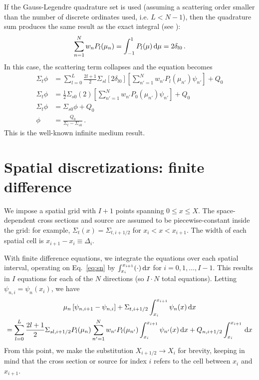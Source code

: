 \documentclass[]{SRJcommon}
\begin{document}
If the Gauss-Legendre quadrature set is used (assuming a scattering order
smaller than the number of discrete ordinates used, i.e. $L < N-1$),
then the quadrature sum
produces the same result as the exact integral (see \cite[p.121]{Lew1984}):
$$ \sum_{n=1}^{N} w_{n} P_{l}(\mu_n) 
= \int_{-1}^{1} P_l(\mu) \, \mathrm{d} \mu
= 2 \delta_{l0} \,.$$
In this case, the scattering term collapses and the equation becomes
\begin{align*}
  \Sigma_t \phi 
  &= \sum_{l=0}^{L}  \frac{2l+1}{2} \Sigma_{sl} \left[ 2 \delta_{l0} \right] \left[ \sum_{n'=1}^{N} w_{n'} P_{l} (\mu_{n'}) \psi_{n'}
\right] + Q_0
\\
  \Sigma_t \phi 
  &=  \frac{1}{2} \Sigma_{s0} (2) \left[ \sum_{n'=1}^{N} w_{n'} P_{0} (\mu_{n'}) \psi_{n'}
\right] + Q_0
\\
\Sigma_t \phi 
  &=  \Sigma_{s0} \phi + Q_0
\\
\phi 
&=  \frac{Q_0}{\Sigma_t - \Sigma_{s0}} \,.
\end{align*}
This is the well-known infinite medium result.
\section{Spatial discretizations: finite difference}
We impose a spatial grid with $I+1$ points spanning $0 \le x \le X$. The
space-dependent cross sections and source are assumed to be piecewise-constant
inside the grid: for example, $\Sigma_t(x) = \Sigma_{t,i+1/2}$ for $x_{i} < x
< x_{i+1}$. The width of each spatial cell is $x_{i+1} - x_{i} \equiv
\Delta_i$. 

With finite difference equations, we integrate the \SN{} equations over each
spatial interval, operating on Eq.~\eqref{eq:sn} by $\int_{x_{i}}^{x_{i+1}}
(\cdot) \, \mathrm{d} x$ for $i = 0,1,\ldots, I-1$.
This results in $I$ equations for each of the $N$ directions (so $I \cdot N$
total equations). Letting $\psi_{n,i} = \psi_n(x_i)$, we have
\begin{multline}
  \mu_n \left[ \psi_{n,i+1} - \psi_{n,i} \right] + \Sigma_{t,i+1/2}
  \int_{x_{i}}^{x_{i+1}} \psi_n(x) \, \mathrm{d} x
\\
= \sum_{l=0}^{L}  \frac{2l+1}{2} \Sigma_{sl,i+1/2} P_{l}(\mu_n)
 \sum_{n'=1}^{N} w_{n'} P_{l} (\mu_{n'}) \int_{x_{i}}^{x_{i+1}} \psi_{n'}(x) \, \mathrm{d} x
  + Q_{n,i+1/2} \int_{x_{i}}^{x_{i+1}} \, \mathrm{d} x
  \label{eq:finitediff}
\end{multline}
From this
point, we make the substitution $X_{i+1/2} \to X_{i}$ for brevity, keeping in
mind that the cross section or source for index $i$ refers to the cell between
$x_i$ and $x_{i+1}$.
\end{document}
